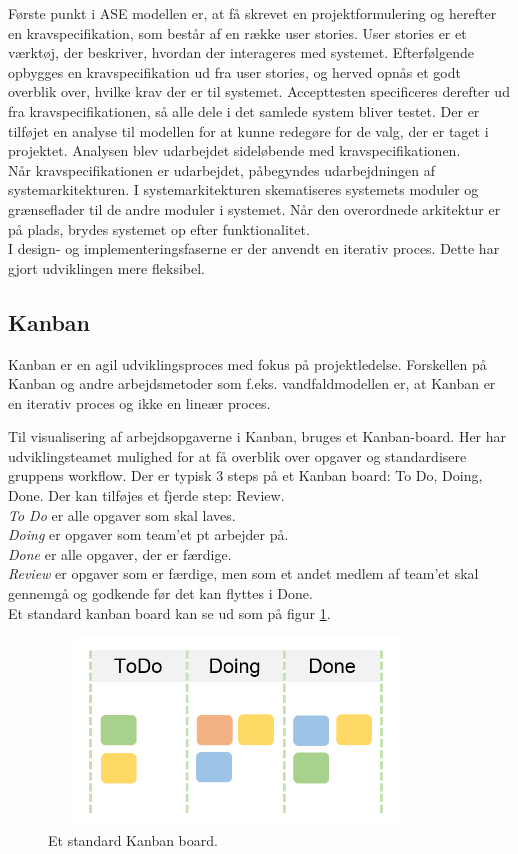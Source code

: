 Første punkt i ASE modellen er, at få skrevet en projektformulering og herefter en kravspecifikation, som består af en række user stories. User stories er et værktøj, der beskriver, hvordan der interageres med systemet. Efterfølgende opbygges en kravspecifikation ud fra user stories, og herved opnås et godt overblik over, hvilke krav der er til systemet. Accepttesten specificeres derefter ud fra kravspecifikationen, så alle dele i det samlede system bliver testet.
Der er tilføjet en analyse til modellen for at kunne redegøre for de valg, der er taget i projektet. Analysen blev udarbejdet sideløbende med kravspecifikationen. \\
Når kravspecifikationen er udarbejdet, påbegyndes udarbejdningen af systemarkitekturen. I systemarkitekturen skematiseres systemets moduler og grænseflader til de andre moduler i systemet. Når den overordnede arkitektur er på plads, brydes systemet op efter funktionalitet. \\
I design- og implementeringsfaserne er der anvendt en iterativ proces. Dette har gjort udviklingen mere fleksibel.

\subsection{Kanban}
Kanban \cite{Kanban} er en agil udviklingsproces med fokus på projektledelse. Forskellen på Kanban og andre arbejdsmetoder som f.eks. vandfaldmodellen\cite{Vandfald} er, at Kanban er en iterativ proces og ikke en lineær proces.

Til visualisering af arbejdsopgaverne i Kanban, bruges et Kanban-board. Her har udviklingsteamet mulighed for at få overblik over opgaver og standardisere gruppens workflow. Der er typisk 3 steps på et Kanban board: To Do, Doing, Done. Der kan tilføjes et fjerde step: Review. \\
\emph{To Do} er alle opgaver som skal laves. \\
\emph{Doing} er opgaver som team'et pt arbejder på. \\
\emph{Done} er alle opgaver, der er færdige. \\
\emph{Review} er opgaver som er færdige, men som et andet medlem af team'et skal gennemgå og godkende før det kan flyttes i Done.\\
Et standard kanban board kan se ud som på figur \ref{fig:Kanban}.
\begin{figure} [H]
	\begin{center}
		\includegraphics[height=5cm, width=10cm]{Udviklingsforlob/kanbanboard}
	\end{center}
	\caption{Et standard Kanban board. \cite{Kanban}}
	\label{fig:Kanban}
\end{figure}

